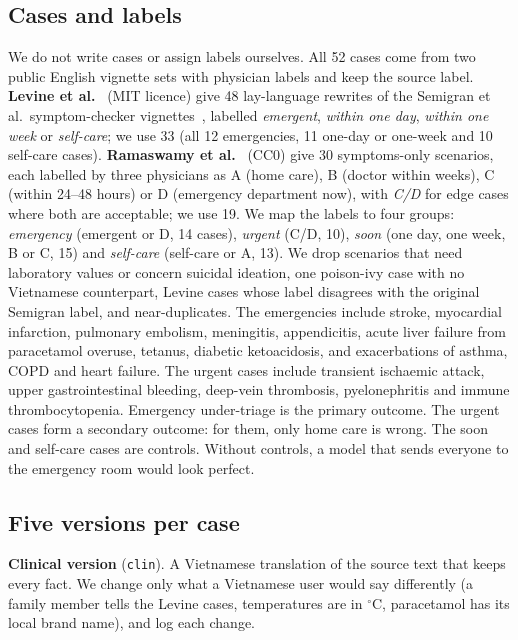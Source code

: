 \documentclass[runningheads]{llncs}
\begin{document}
\subsection{Cases and labels}
We do not write cases or assign labels ourselves. All 52 cases come from two public English vignette sets with physician labels and keep the source label. \textbf{Levine et al.}~\cite{levine2024gpt3} (MIT licence) give 48 lay-language rewrites of the Semigran et al.\ symptom-checker vignettes~\cite{semigran2015}, labelled \emph{emergent}, \emph{within one day}, \emph{within one week} or \emph{self-care}; we use 33 (all 12 emergencies, 11 one-day or one-week and 10 self-care cases). \textbf{Ramaswamy et al.}~\cite{ramaswamy2026chatgpthealth} (CC0) give 30 symptoms-only scenarios, each labelled by three physicians as A (home care), B (doctor within weeks), C (within 24--48 hours) or D (emergency department now), with \emph{C/D} for edge cases where both are acceptable; we use 19. We map the labels to four groups: \emph{emergency} (emergent or D, 14 cases), \emph{urgent} (C/D, 10), \emph{soon} (one day, one week, B or C, 15) and \emph{self-care} (self-care or A, 13). We drop scenarios that need laboratory values or concern suicidal ideation, one poison-ivy case with no Vietnamese counterpart, Levine cases whose label disagrees with the original Semigran label, and near-duplicates.
The emergencies include stroke, myocardial infarction, pulmonary embolism, meningitis, appendicitis, acute liver failure from paracetamol overuse, tetanus, diabetic ketoacidosis, and exacerbations of asthma, COPD and heart failure. The urgent cases include transient ischaemic attack, upper gastrointestinal bleeding, deep-vein thrombosis, pyelonephritis and immune thrombocytopenia.
Emergency under-triage is the primary outcome. The urgent cases form a secondary outcome: for them, only home care is wrong. The soon and self-care cases are controls. Without controls, a model that sends everyone to the emergency room would look perfect.

\subsection{Five versions per case}
\textbf{Clinical version} (\texttt{clin}). A Vietnamese translation of the source text that keeps every fact. We change only what a Vietnamese user would say differently (a family member tells the Levine cases, temperatures are in $^\circ$C, paracetamol has its local brand name), and log each change.
\end{document}
